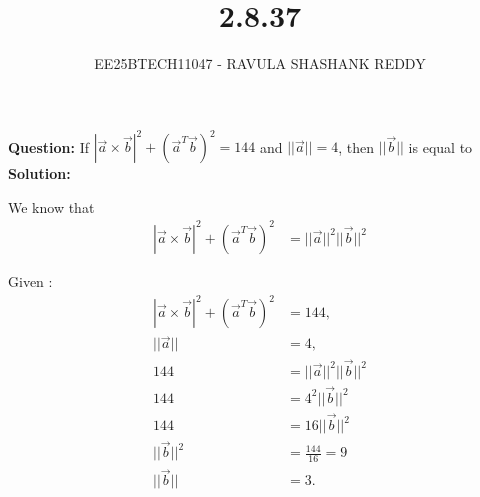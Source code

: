 \documentclass[journal]{article}
\begin{document}
	
	
	\vspace{3cm}
	
\title{2.8.37}
\author{EE25BTECH11047 - RAVULA SHASHANK REDDY}
\maketitle
\hrulefill
\bigskip 

\renewcommand{\thetable}{\theenumi}
\setlength{\intextsep}{10pt}

\textbf{Question:}  
If $|\vec{a}\times \vec{b}|^2 + (\vec{a}^T \vec{b})^2 = 144$ and $||\vec{a}|| = 4$, then $||\vec{b}||$ is equal to \underline{\hspace{2cm}}\\

\textbf{Solution:}  

We know that
\begin{align}
|\vec{a}\times \vec{b}|^2 + (\vec{a}^T \vec{b})^2
&= ||\vec{a}||^2||\vec{b}||^2
\end{align}

Given :
\begin{align}
|\vec{a}\times \vec{b}|^2 + (\vec{a}^T \vec{b})^2 &= 144, \\
||\vec{a}|| &= 4, \\
144 &= ||\vec{a}||^2||\vec{b}||^2 \\
144 &= 4^2||\vec{b}||^2 \\
144 &= 16||\vec{b}||^2 \\
||\vec{b}||^2 &= \frac{144}{16} = 9 \\
||\vec{b}|| &= 3.
\end{align}
\end{document}
